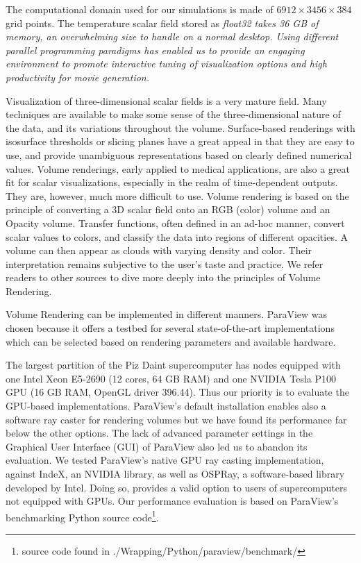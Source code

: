 \documentclass[5p,times]{elsarticle}
\begin{document}
The computational domain  used for our simulations is made of $ 6912 \times 3456 \times 384 $ grid points.
The temperature scalar field stored as \it{float32} \rm takes 36 GB of memory, an
overwhelming size to handle on a normal desktop. Using different parallel programming
paradigms has enabled us to provide an engaging environment to promote interactive tuning of
visualization options and high productivity for movie generation.

Visualization of three-dimensional scalar fields is a very mature field. Many techniques are
available to make some sense of the three-dimensional nature of the data, and its variations
throughout the volume. Surface-based renderings with isosurface thresholds or
slicing planes have a great appeal in that they are easy to use, and provide unambiguous
representations based on clearly defined numerical values. Volume renderings, early applied
to medical applications, are also a great fit for scalar visualizations, especially in the
realm of time-dependent outputs. They are, however, much more difficult to use. Volume rendering is
based on the principle of converting a 3D scalar field onto an RGB (color) volume and an Opacity volume.
Transfer functions, often defined in an ad-hoc manner, convert scalar values to colors, and classify
the data into regions of different opacities. A volume can then appear as clouds with varying density and color.
Their interpretation remains subjective to the user's taste and practice.
We refer readers to other sources \cite{VTKTextbook} to dive more deeply into the principles of Volume Rendering.

Volume Rendering can be implemented in different manners. ParaView was chosen because it offers a testbed
for several state-of-the-art implementations which can be selected based on rendering parameters and
available hardware.

The largest partition of the Piz Daint supercomputer has nodes equipped
with one Intel Xeon E5-2690 (12 cores, 64 GB RAM) and one NVIDIA
Tesla P100 GPU (16 GB RAM, OpenGL driver 396.44). Thus our priority is to evaluate
the GPU-based implementations.
ParaView's default installation enables also a software ray caster for rendering volumes but we have found its performance far
below the other options. The lack of advanced parameter settings in the Graphical
User Interface (GUI) of ParaView also led us to abandon its evaluation. We tested ParaView's native GPU
ray casting implementation, against IndeX, an NVIDIA library, as well as OSPRay, a software-based library developed by Intel.
Doing so, provides a valid option to users of supercomputers not equipped with GPUs.
Our performance evaluation is based on ParaView's benchmarking Python source
code\footnote{source code found in ./Wrapping/Python/paraview/benchmark/}.
\end{document}
